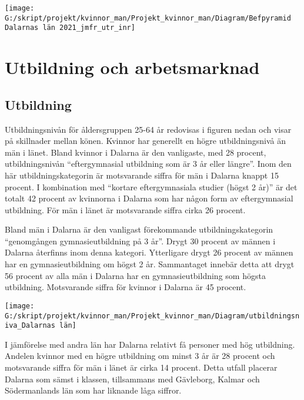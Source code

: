 \documentclass[
]{article}
\begin{document}
\begin{center}\texttt{[image: G:/skript/projekt/kvinnor\_man/Projekt\_kvinnor\_man/Diagram/Befpyramid Dalarnas län 2021\_jmfr\_utr\_inr]} \end{center}

\hypertarget{utbildning-och-arbetsmarknad}{%
\section{Utbildning och
arbetsmarknad}\label{utbildning-och-arbetsmarknad}}

\hypertarget{utbildning}{%
\subsection{Utbildning}\label{utbildning}}

Utbildningsnivån för åldersgruppen 25-64 år redovisas i figuren nedan
och visar på skillnader mellan könen. Kvinnor har generellt en högre
utbildningsnivå än män i länet. Bland kvinnor i Dalarna är den
vanligaste, med 28 procent, utbildningsnivån ``eftergymnasial utbildning
som är 3 år eller längre''. Inom den här utbildningskategorin är
motsvarande siffra för män i Dalarna knappt 15 procent. I kombination
med ``kortare eftergymnasiala studier (högst 2 år)'' är det totalt 42
procent av kvinnorna i Dalarna som har någon form av eftergymnasial
utbildning. För män i länet är motsvarande siffra cirka 26 procent.

Bland män i Dalarna är den vanligast förekommande utbildningskategorin
``genomgången gymnasieutbildning på 3 år''. Drygt 30 procent av männen i
Dalarna återfinns inom denna kategori. Ytterligare drygt 26 procent av
männen har en gymnasieutbildning om högst 2 år. Sammantaget innebär
detta att drygt 56 procent av alla män i Dalarna har en
gymnasieutbildning som högsta utbildning. Motsvarande siffra för kvinnor
i Dalarna är 45 procent.

\begin{center}\texttt{[image: G:/skript/projekt/kvinnor\_man/Projekt\_kvinnor\_man/Diagram/utbildningsniva\_Dalarnas län]} \end{center}

I jämförelse med andra län har Dalarna relativt få personer med hög
utbildning. Andelen kvinnor med en högre utbildning om minst 3 år är 28
procent och motsvarande siffra för män i länet är cirka 14 procent.
Detta utfall placerar Dalarna som sämst i klassen, tillsammans med
Gävleborg, Kalmar och Södermanlands län som har liknande låga siffror.
\end{document}
